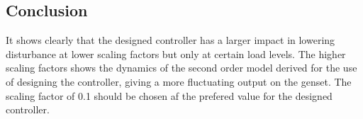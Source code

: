 \subsection*{Conclusion}
It shows clearly that the designed controller has a larger impact in lowering disturbance at lower scaling factors but only at certain load levels. The higher scaling factors shows the dynamics of the second order model derived for the use of designing the controller, giving a more fluctuating output on the genset. The scaling factor of 0.1 should be chosen af the prefered value for the designed controller.    